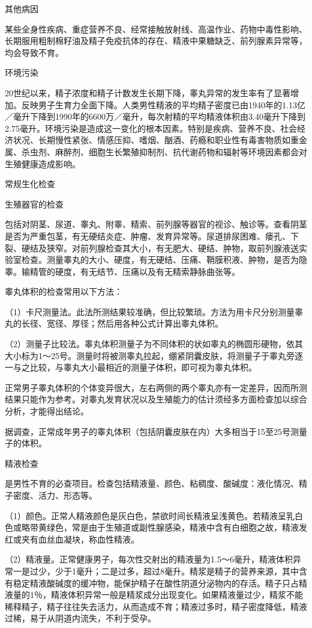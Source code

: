 \documentclass[12pt,UTF8]{ctexbook}
\begin{document}
其他病因

某些全身性疾病、重症营养不良、经常接触放射线、高温作业、药物中毒性影响、长期服用粗制棉籽油及精子免疫抗体的存在、精液中果糖缺乏、前列腺素异常等，均会导致不育。

环境污染

20世纪以来，精子浓度和精子计数发生长期下降，睾丸异常的发生率有了显著增加。反映男子生育力全面下降。人类男性精液的平均精子密度已由1940年的1.13亿／毫升下降到1990年的6600万／毫升，每次射精的平均精液体积由3.40毫升下降到2.75毫升。环境污染是造成这一变化的根本因素。特别是疾病、营养不良、社会经济状况、长期慢性紧张、情感压抑、嗜烟、酗酒、药瘾和职业性有毒害物质如重金属、杀虫剂、麻醉剂、细胞生长繁殖抑制剂、抗代谢药物和辐射等环境因素都会对生殖健康造成影响。





常规生化检查


生殖器官的检查

包括对阴茎、尿道、睾丸、附睾、精索、前列腺等器官的视诊、触诊等。查看阴茎是否为严重包茎，有无硬结炎症、肿瘤、发育异常等。尿道排尿困难、瘘孔、下裂、硬结及狭窄。对前列腺检查其大小，有无肥大、硬结、肿物，取前列腺液送实验室检查。测量睾丸的大小、硬度，有无硬结、压痛、鞘膜积液、肿物，是否为隐睾。输精管的硬度，有无结节、压痛以及有无精索静脉曲张等。

睾丸体积的检查常用以下方法：

（1）卡尺测量法。此法所测结果较准确，但比较繁琐。方法为用卡尺分别测量睾丸的长径、宽径、厚径；然后用各种公式计算出睾丸体积。

（2）测量子比较法。睾丸体积测量子为不同体积的状如睾丸的椭圆形硬物，依其大小标为1～25号。测量时将被测睾丸拉起，绷紧阴囊皮肤，将测量子于睾丸旁逐一与之比较，与睾丸大小最相近的测量子体积，即可视为睾丸体积。

正常男子睾丸体积的个体变异很大，左右两侧的两个睾丸亦有一定差异，因而所测结果只能作为参考。对睾丸发育状况以及生殖能力的估计须经多方面检查加以综合分析，才能得出结论。

据调查，正常成年男子的睾丸体积（包括阴囊皮肤在内）大多相当于15至25号测量子的体积。

精液检查

是男性不育的必查项目。检查包括精液量、颜色、粘稠度、酸碱度：液化情况、精子密度、活力、形态等。

（1）颜色。正常人精液颜色是灰白色，禁欲时间长精液呈浅黄色。若精液呈乳白色或略带黄绿色，常是由于生殖道或副性腺感染，精液中含有白细胞之故，精液发红或夹有血丝血凝块，称血性精液。

（2）精液量。正常健康男子，每次性交射出的精液量为1.5～6毫升，精液体积异常一是过少，少于1毫升；二是过多，超过8毫升。精浆是精子的营养来源，其中含有稳定精液酸碱度的缓冲物，能保护精子在酸性阴道分泌物内的存活。精子只占精液量的1％，精液体积异常一般是精浆成分出现变化。如果精液量过少，精浆不能稀释精子，精子往往失去活力，从而造成不育；精液过多时，精子密度降低，精液过稀，易于从阴道内流失，不利于受孕。
\end{document}
